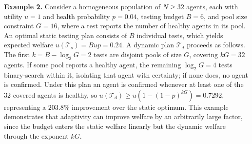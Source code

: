 
\noindent\textbf{Example 2.} Consider a homogeneous population of
$N \geq 32$ agents, each with utility $u = 1$ and health probability
$p = 0.04$, testing budget $B = 6$, and pool size constraint $G = 16$, where a
test reports the number of healthy agents in its pool. An optimal static
testing plan consists of $B$ individual tests, which yields expected welfare
$u(\mathcal{T}_s) = Bup = 0.24$. A dynamic plan $\mathcal{T}_d$ proceeds as
follows. The first $k = B - \log_2 G = 2$ tests are disjoint pools of size $G$,
covering $kG = 32$ agents. If some pool reports a healthy agent, the remaining
$\log_2 G = 4$ tests binary-search within it, isolating that agent with
certainty; if none does, no agent is confirmed. Under this plan an agent is
confirmed whenever at least one of the $32$ covered agents is healthy, so
$u(\mathcal{T}_d) \geq u(1 - (1-p)^{kG}) = 0.7292$, representing a $203.8\%$
improvement over the static optimum. This example demonstrates that adaptivity
can improve welfare by an arbitrarily large factor, since the budget enters the
static welfare linearly but the dynamic welfare through the exponent $kG$.
